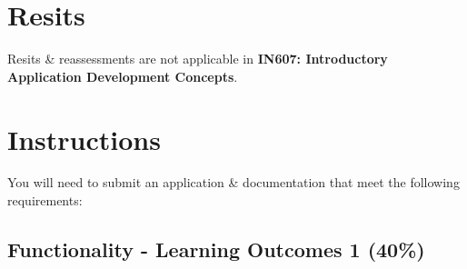 \documentclass{article}
\begin{document}
\section*{Resits}
Resits \& reassessments are not applicable in \textbf{IN607: Introductory Application Development Concepts}. 

\newpage

\section*{Instructions}
You will need to submit an application \& documentation that meet the following requirements:

\subsection*{Functionality - Learning Outcomes 1 (40\%)}
\end{document}
